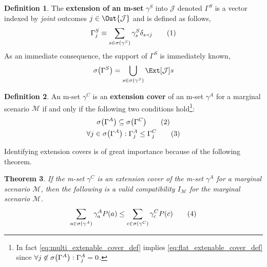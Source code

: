 \documentclass[aps, 10pt, english, twoside, pra, nofootinbib, longbibliography]{revtex4-1}
\theoremstyle{plain}
\newtheorem{theorem}{Theorem}
\theoremstyle{definition}
\newtheorem{definition}[theorem]{Definition}
\theoremstyle{remark}
\newcommand{\ext}{\mathrel{\Yleft}}
\newcommand{\mscenario}{\mathcal{M}}
\newcommand{\jointvar}{\mathcal{J}}
\newcommand{\mset}[1]{\gamma^{#1}}
\newcommand{\extmset}[1]{\Gamma^{#1}}
\newcommand{\supp}[1]{\si\br{#1}}
\newcommand{\term}[1]{\textcolor{Mahogany}{\textbf{#1}}}
\begin{document}
    \begin{definition}
        The \term{extension of an m-set} $\mset{S}$ into $\jointvar$ denoted $\extmset{S}$ is a vector indexed by \textit{joint} outcomes $j \in \Out{\jointvar}$ and is defined as follows,
        \[ \extmset{S}_{j} \defined \sum_{s \in \supp{\mset{S}}} \mset{S}_{s} \de_{s \ext j} \eq \label{eq:joint_multiplicity} \]
        As an immediate consequence, the support of $\extmset{S}$ is immediately known,
        \[ \supp{\extmset{S}} = \bigcup_{s \in \supp{\mset{S}}} \Ext[\jointvar]{s} \]
    \end{definition}
    \begin{definition}
        An m-set $\mset{C}$ is an \term{extension cover} of an m-set $\mset{A}$ for a marginal scenario $\mscenario$ if and only if the following two conditions hold\footnote{In fact \cref{eq:multi_extenable_cover_def} implies \cref{eq:flat_extenable_cover_def} since $\forall j \not \in \supp{\extmset{A}} : \extmset{A}_j = 0$.}:
        \begin{gather*}
            \supp{\extmset{A}} \subseteq \supp{\extmset{C}} \eq \label{eq:flat_extenable_cover_def}\\
            \forall j \in \supp{\extmset{A}} : \extmset{A}_{j} \leq \extmset{C}_j \eq \label{eq:multi_extenable_cover_def}
        \end{gather*}
    \end{definition}
    Identifying extension covers is of great importance because of the following theorem.
    \begin{theorem}
        \label{thm:extendable_cover_ineq}
        If the m-set $\mset{C}$ is an extension cover of the m-set $\mset{A}$ for a marginal scenario $\mscenario$, then the following is a valid compatibility $I_{\mscenario}$ for the marginal scenario $\mscenario$.
        \[ \sum_{a \in \supp{\mset{A}}}\mset{A}_a\prob[][a] \leq \sum_{c \in \supp{\mset{C}}}\mset{C}_c\prob[][c] \eq \label{eq:extendable_cover} \]
    \end{theorem}
\end{document}
